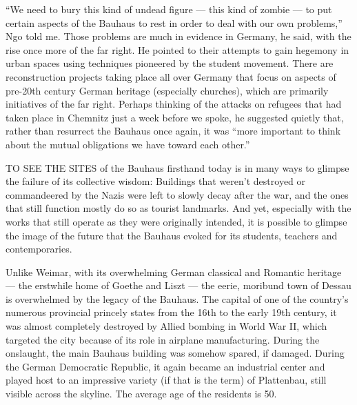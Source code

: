 ``We need to bury this kind of undead figure --- this kind of zombie ---
to put certain aspects of the Bauhaus to rest in order to deal with our
own problems,'' Ngo told me. Those problems are much in evidence in
Germany, he said, with the rise once more of the far right. He pointed
to their attempts to gain hegemony in urban spaces using techniques
pioneered by the student movement. There are reconstruction projects
taking place all over Germany that focus on aspects of pre-20th century
German heritage (especially churches), which are primarily initiatives
of the far right. Perhaps thinking of the attacks on refugees that had
taken place in Chemnitz just a week before we spoke, he suggested
quietly that, rather than resurrect the Bauhaus once again, it was
``more important to think about the mutual obligations we have toward
each other.''

TO SEE THE SITES of the Bauhaus firsthand today is in many ways to
glimpse the failure of its collective wisdom: Buildings that weren't
destroyed or commandeered by the Nazis were left to slowly decay after
the war, and the ones that still function mostly do so as tourist
landmarks. And yet, especially with the works that still operate as they
were originally intended, it is possible to glimpse the image of the
future that the Bauhaus evoked for its students, teachers and
contemporaries.

Unlike Weimar, with its overwhelming German classical and Romantic
heritage --- the erstwhile home of Goethe and Liszt --- the eerie,
moribund town of Dessau is overwhelmed by the legacy of the Bauhaus. The
capital of one of the country's numerous provincial princely states from
the 16th to the early 19th century, it was almost completely destroyed
by Allied bombing in World War II, which targeted the city because of
its role in airplane manufacturing. During the onslaught, the main
Bauhaus building was somehow spared, if damaged. During the German
Democratic Republic, it again became an industrial center and played
host to an impressive variety (if that is the term) of Plattenbau, still
visible across the skyline. The average age of the residents is 50.

